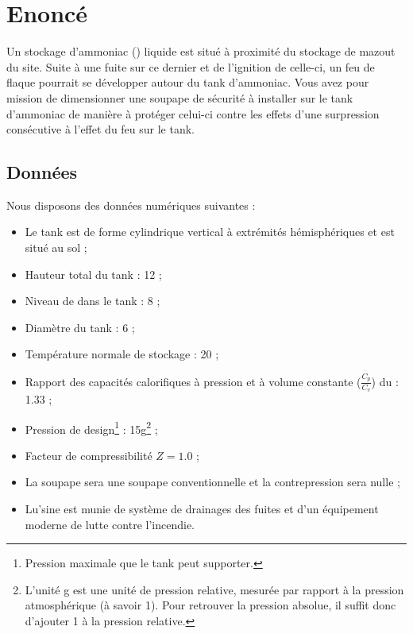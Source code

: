 

\section{Enoncé}
Un stockage d’ammoniac () liquide est
situé à proximité du stockage de mazout du site.
Suite à une fuite sur ce dernier et de l’ignition
de celle-ci, un feu de flaque pourrait se développer
autour du tank d’ammoniac.  Vous avez pour mission
de dimensionner une soupape de sécurité à installer
sur le tank d’ammoniac de manière à protéger celui-ci
contre les effets d’une surpression consécutive à 
l’effet du feu sur le tank.

\subsection{Données}
Nous disposons des données numériques suivantes :

\begin{itemize}
	\item Le tank est de forme cylindrique vertical à 
	extrémités hémisphériques et est situé au sol ;
	\item Hauteur total du tank : \unit{12}{\meter} ;
	\item Niveau de  dans le tank : \unit{8}{\meter} ;
	\item Diamètre du tank : \unit{6}{\meter} ;
	\item Température normale de stockage : \unit{20}{\degreecelsius} ;
	\item Rapport des capacités calorifiques à pression
	et à volume constante ($\frac{C_p}{C_v}$) du  : 1.33 ;
	\item Pression de design\footnote{Pression maximale
	que le tank peut supporter.} : \unit{15}{\bbar g}\footnote{L'unité
	\unit{}{\bbar g} est une unité de pression relative, mesurée par 
	rapport à la pression atmosphérique (à savoir \unit{1}{\bbar}). Pour
	retrouver la pression absolue, il suffit donc d'ajouter \unit{1}{\bbar}
	à la pression relative.} ;
	\item Facteur de compressibilité $Z = 1.0$ ;
	\item La soupape sera une soupape conventionnelle et 
	la contrepression sera nulle ;
	\item Lu'sine est munie de système de drainages des fuites 
	et d'un équipement moderne de lutte contre l'incendie.
\end{itemize}

